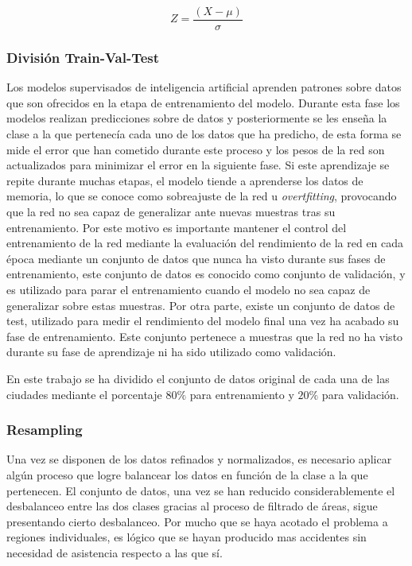 \documentclass{uathesis-es}
\begin{document}
\begin{equation}
       Z = \frac{(X - \mu)}{\sigma}
\end{equation}


\subsubsection{División Train-Val-Test}


Los modelos supervisados de inteligencia artificial aprenden patrones sobre datos que son ofrecidos en la etapa de entrenamiento del modelo. Durante esta fase los modelos realizan predicciones sobre de datos y posteriormente se les enseña la clase a la que pertenecía cada uno de los datos que ha predicho, de esta forma se mide el error que han cometido durante este proceso y los pesos de la red son actualizados para minimizar el error en la siguiente fase. Si este aprendizaje se repite durante muchas etapas, el modelo tiende a aprenderse los datos de memoria, lo que se conoce como sobreajuste de la red u \textit{overtfitting}, provocando que la red no sea capaz de generalizar ante nuevas muestras tras su entrenamiento. Por este motivo es importante mantener el control del entrenamiento de la red mediante la evaluación del rendimiento de la red en cada época mediante un conjunto de datos que nunca ha visto durante sus fases de entrenamiento, este conjunto de datos es conocido como conjunto de validación, y es utilizado para parar el entrenamiento cuando el modelo no sea capaz de generalizar sobre estas muestras. Por otra parte, existe un conjunto de datos de test, utilizado para medir el rendimiento del modelo final una vez ha acabado su fase de entrenamiento. Este conjunto pertenece a muestras que la red no ha visto durante su fase de aprendizaje ni ha sido utilizado como validación.

En este trabajo se ha dividido el conjunto de datos original de cada una de las ciudades mediante el porcentaje $80\%$ para entrenamiento y $20\%$ para validación.

\subsubsection{Resampling}

Una vez se disponen de los datos refinados y normalizados, es necesario aplicar algún proceso que logre balancear los datos en función de la clase a la que pertenecen. El conjunto de datos, una vez se han reducido considerablemente el desbalanceo entre las dos clases gracias al proceso de filtrado de áreas, sigue presentando cierto desbalanceo. Por mucho que se haya acotado el problema a regiones individuales, es lógico que se hayan producido mas accidentes sin necesidad de asistencia respecto a las que sí.
\end{document}

